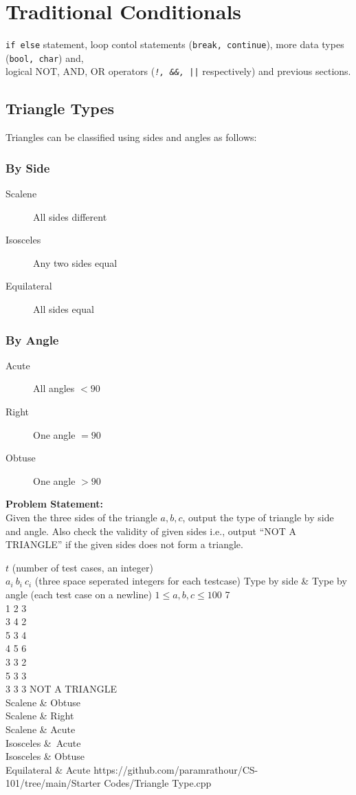\section{Traditional Conditionals}
\begin{topics}
\verb!if else! statement, loop contol statements (\verb!break, continue!), more data types (\verb!bool, char!) and, \\logical NOT, AND, OR operators (\emph{\texttt{!, \&\&, ||}} respectively) and previous sections.
\end{topics}
\subsection{Triangle Types}
Triangles can be classified using sides and angles as follows:
\subsubsection{By Side}
\begin{description}
\item[Scalene] All sides different
\item[Isosceles] Any two sides equal
\item[Equilateral] All sides equal
\end{description}
\subsubsection{By Angle}
\begin{description}
\item[Acute] All angles $< 90$\textdegree
\item[Right] One angle $= 90$\textdegree
\item[Obtuse] One angle $> 90$\textdegree
\end{description}
\textbf{Problem Statement:}\\
Given the three sides of the triangle $a,b,c$, output the type of triangle by side and angle. Also check the validity of given sides i.e., output ``NOT A TRIANGLE'' if the given sides does not form a triangle.
\begin{testcases}
	{$t$ \hfill(number of test cases, an integer)\\
	$a_{i}\ b_{i}\ c_{i}$ \hfill(three space seperated integers for each testcase)}
	{Type by side \& Type by angle \hfill{(each test case on a newline)}}
	{$1 \leq a,b,c \leq 100$}
	{7\\1 2 3\\3 4 2\\5 3 4\\4 5 6\\3 3 2\\5 3 3\\3 3 3}
	{NOT A TRIANGLE\\Scalene \& Obtuse\\Scalene \& Right\\Scalene \& Acute\\Isosceles \&\ Acute\\Isosceles \& Obtuse\\Equilateral \& Acute}
	{https://github.com/paramrathour/CS-101/tree/main/Starter Codes/Triangle Type.cpp}
\end{testcases}

